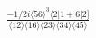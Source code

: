 \documentclass[varwidth, border=5pt]{standalone}
\begin{document}
\begin{my}
$\begin{gathered}
\scriptscriptstyle\frac{-1/2i\langle56\rangle^3\langle2|1+6|2]}{\langle12\rangle\langle16\rangle\langle23\rangle\langle34\rangle\langle45\rangle}
\end{gathered}$
\end{my}
\end{document}
